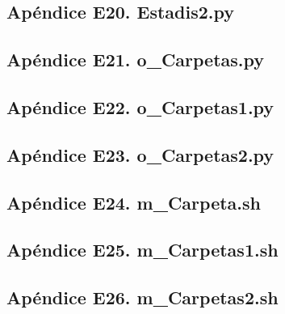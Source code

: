   
\subsection{\footnotesize Ap\'endice E20. Estadis2.py}\label{app:appE20}
 

\subsection{\footnotesize Ap\'endice E21. o\_Carpetas.py}\label{app:appE21}


\subsection{\footnotesize Ap\'endice E22. o\_Carpetas1.py}\label{app:appE22}
 


\subsection{\footnotesize Ap\'endice E23. o\_Carpetas2.py}\label{app:appE23}
 

\subsection{\footnotesize Ap\'endice E24. m\_Carpeta.sh}\label{app:appE24}
 

\subsection{\footnotesize Ap\'endice E25. m\_Carpetas1.sh}\label{app:appE25}
 

\subsection{\footnotesize Ap\'endice E26. m\_Carpetas2.sh}\label{app:appE26}
 

